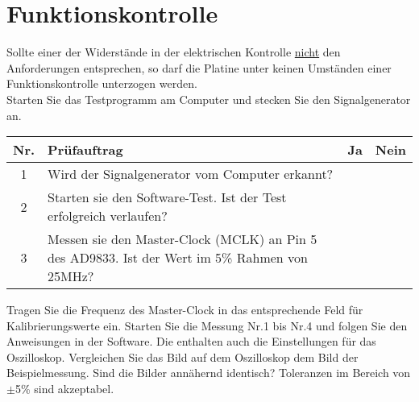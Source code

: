 \documentclass[a4paper,12pt]{article}
\begin{document}
\section{Funktionskontrolle}
Sollte einer der Widerstände in der elektrischen Kontrolle \underline{nicht} den Anforderungen entsprechen, so darf die Platine unter keinen Umständen einer Funktionskontrolle unterzogen werden.\\
Starten Sie das Testprogramm am Computer und stecken Sie den Signalgenerator an.
\begin{flushleft}
	\begin{tabular}{|c||p{10cm}|c|c|}
		\hline
		Nr. & Prüfauftrag & Ja & Nein\\
		\hline
		1 & Wird der Signalgenerator vom Computer erkannt? & & \\
		\hline
		2 & Starten sie den Software-Test. Ist der Test erfolgreich verlaufen? & & \\
		\hline
		3 & Messen sie den Master-Clock (MCLK) an Pin 5 des AD9833. Ist der Wert im 5\% Rahmen von 25MHz? & & \\
		\hline
	\end{tabular}
\end{flushleft}
Tragen Sie die Frequenz des Master-Clock in das entsprechende Feld für Kalibrierungswerte ein.
\medskip		
Starten Sie die Messung Nr.1 bis Nr.4 und folgen Sie den Anweisungen in der Software. Die enthalten auch die Einstellungen für das Oszilloskop. Vergleichen Sie das Bild auf dem Oszilloskop dem Bild der Beispielmessung. Sind die Bilder annähernd identisch? Toleranzen im Bereich von $\pm$5\% sind akzeptabel.
\end{document}
